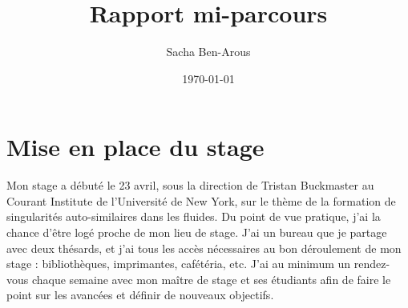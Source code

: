 \documentclass[12pt,a4paper]{article}
\title{\textbf{Rapport mi-parcours}}
\date{\today}
\author{Sacha Ben-Arous}
\begin{document}
\maketitle

\section{Mise en place du stage}

Mon stage a débuté le 23 avril, sous la direction de Tristan Buckmaster au Courant Institute de l'Université de New York, sur le thème de la formation de singularités auto-similaires dans les fluides. Du point de vue pratique, j'ai la chance d'être logé proche de mon lieu de stage. J'ai un bureau que je partage avec deux thésards, et j'ai tous les accès nécessaires au bon déroulement de mon stage : bibliothèques, imprimantes, cafétéria, etc. J'ai au minimum un rendez-vous chaque semaine avec mon maître de stage et ses étudiants afin de faire le point sur les avancées et définir de nouveaux objectifs.
\end{document}
